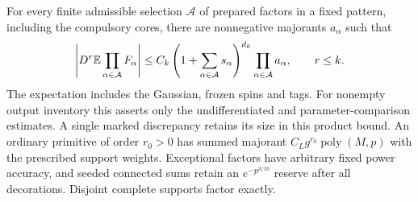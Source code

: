 \begin{proposition}
\label{prop:rg-joint}
For every finite admissible selection $\mathcal A$ of prepared
factors in a fixed pattern, including the compulsory cores, there
are nonnegative majorants $a_\alpha$ such that
\[
 \left|D^r\mathbb E\prod_{\alpha\in\mathcal A}F_\alpha\right|
 \le C_k\left(1+\sum_{\alpha\in\mathcal A}s_\alpha\right)^{d_k}
                        \prod_{\alpha\in\mathcal A}a_\alpha,
 \qquad r\le k.
\]
The expectation includes the Gaussian, frozen spins and tags.
For nonempty output inventory this asserts only the undifferentiated
and parameter-comparison estimates.  A single marked discrepancy
retains its size in this product bound.  An ordinary primitive of
order $r_0>0$ has summed majorant
$C_Lg^{r_0}\operatorname{poly}(M,p)$ with the prescribed support
weights.  Exceptional factors have arbitrary fixed power accuracy,
and seeded connected sums retain an $e^{-p^{3/10}}$ reserve after
all decorations.  Disjoint complete supports factor exactly.
\end{proposition}

